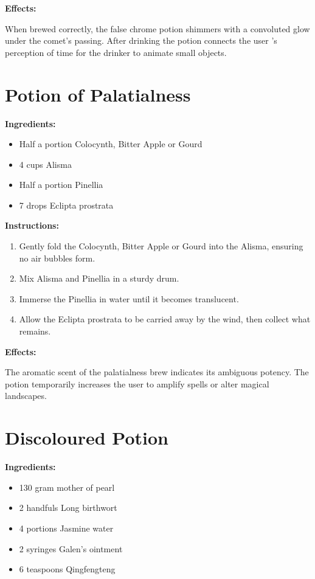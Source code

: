 \documentclass{article}
\begin{document}
\textbf{Effects:}

When brewed correctly, the false chrome potion shimmers with a convoluted glow under the comet’s passing. After drinking the potion connects the user 's perception of time for the drinker to animate small objects.

\newpage
\section*{Potion of Palatialness}

\textbf{Ingredients:}

\begin{itemize}
  \item Half a portion Colocynth, Bitter Apple or Gourd
  \item 4 cups Alisma
  \item Half a portion Pinellia
  \item 7 drops Eclipta prostrata
\end{itemize}

\textbf{Instructions:}

\begin{enumerate}
  \item Gently fold the Colocynth, Bitter Apple or Gourd into the Alisma, ensuring no air bubbles form.
  \item Mix Alisma and Pinellia in a sturdy drum.
  \item Immerse the Pinellia in water until it becomes translucent.
  \item Allow the Eclipta prostrata to be carried away by the wind, then collect what remains.
\end{enumerate}

\textbf{Effects:}

The aromatic scent of the palatialness brew indicates its ambiguous potency. The potion temporarily increases the user to amplify spells or alter magical landscapes.

\newpage
\section*{Discoloured Potion}

\textbf{Ingredients:}

\begin{itemize}
  \item 130 gram mother of pearl
  \item 2 handfuls Long birthwort
  \item 4 portions Jasmine water
  \item 2 syringes Galen's ointment
  \item 6 teaspoons Qingfengteng
\end{itemize}
\end{document}
